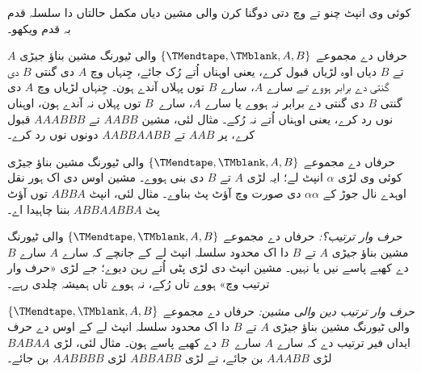 \documentclass[../../../include/open-logic-section]{subfiles}
\begin{document}
\begin{prob}
کوئی وی انپٹ
چنو تے
وچ دتی دوگنا
کرن والی مشین
دیاں مکمل حالتاں
دا سلسلہ قدم بہ
قدم ویکھو۔
\end{prob}

\begin{prob}
حرفاں دے مجموعے
$\{\TMendtape,\TMblank, A, B\}$
والی ٹیورنگ مشین
بناؤ جیڑی $A$
تے $B$ دیاں اوہ
لڑیاں قبول کرے،
یعنی اوہناں اُتے
رُک جائے، جِنہاں
وچ $A$ دی گنتی
$B$ دی گنتی دے
برابر ہووے
\emph{تے} سارے
$A$، سارے $B$
توں پہلاں آندے
ہون۔ جِنہاں لڑیاں
وچ $A$ دی گنتی
$B$ دی گنتی
دے برابر نہ ہووے
یا سارے $A$،
سارے~$B$ توں
پہلاں نہ آندے
ہون، اوہناں نوں
رد کرے، یعنی
اوہناں اُتے نہ
رُکے۔ مثال لئی،
مشین $AABB$
تے $AAABBB$
قبول کرے، پر $AAB$
تے $AABBAABB$
دونوں نوں رد کرے۔
\end{prob}

\begin{prob}
حرفاں دے مجموعے
$\{\TMendtape,\TMblank, A, B\}$
والی ٹیورنگ مشین
بناؤ جیڑی کوئی
وی لڑی $\alpha$
انپٹ لے؛ ایہ
لڑی $A$ تے $B$
دی بنی ہووے۔
مشین اوس دی اک ہور نقل
اوہدے نال جوڑ کے
$\alpha\alpha$
دی صورت وچ
آؤٹ پٹ بناوے۔
مثال لئی، انپٹ
$ABBA$ توں
آؤٹ پٹ
$ABBAABBA$
بننا چاہیدا اے۔
\end{prob}

\begin{prob}
\emph{حرف وار ترتیب؟:}
حرفاں دے مجموعے
$\{\TMendtape,\TMblank, A, B\}$
والی ٹیورنگ مشین
بناؤ جیڑی
$A$ تے $B$
دا اک محدود
سلسلہ انپٹ
لے کے جانچے
کہ سارے $A$
سارے $B$
دے کھبے پاسے
نیں یا نہیں۔
مشین انپٹ
دی لڑی پٹی
اُتے رہن دیوے؛
جے لڑی «حرف
وار ترتیب وچ»
ہووے تاں رُکے،
نہ ہووے تاں
ہمیشہ چلدی
رہے۔
\end{prob}

\begin{prob}
\emph{حرف وار ترتیب
دین والی مشین:}
حرفاں دے مجموعے
$\{\TMendtape,\TMblank, A, B\}$
والی ٹیورنگ مشین
بناؤ جیڑی
$A$ تے $B$
دا اک محدود
سلسلہ انپٹ
لے کے اوس
دے حرف ایداں
فیر ترتیب دے
کہ سارے $A$
سارے~$B$ دے
کھبے پاسے
ہون۔ مثال لئی،
لڑی $BABAA$
لڑی $AAABB$
بن جائے، تے
لڑی $ABBABB$
لڑی $AABBBB$
بن جائے۔
\end{prob}
\end{document}
